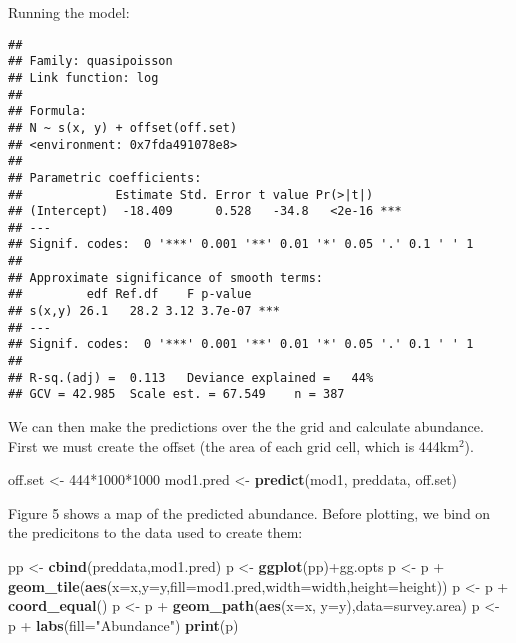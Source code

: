 \documentclass[]{article}
\newenvironment{Shaded}{}{}
\newcommand{\KeywordTok}[1]{\textcolor[rgb]{0.00,0.44,0.13}{\textbf{{#1}}}}
\newcommand{\DataTypeTok}[1]{\textcolor[rgb]{0.56,0.13,0.00}{{#1}}}
\newcommand{\DecValTok}[1]{\textcolor[rgb]{0.25,0.63,0.44}{{#1}}}
\newcommand{\StringTok}[1]{\textcolor[rgb]{0.25,0.44,0.63}{{#1}}}
\newcommand{\NormalTok}[1]{{#1}}
\begin{document}
Running the model:

\begin{Shaded}
\end{Shaded}

\begin{verbatim}
## 
## Family: quasipoisson 
## Link function: log 
## 
## Formula:
## N ~ s(x, y) + offset(off.set)
## <environment: 0x7fda491078e8>
## 
## Parametric coefficients:
##             Estimate Std. Error t value Pr(>|t|)    
## (Intercept)  -18.409      0.528   -34.8   <2e-16 ***
## ---
## Signif. codes:  0 '***' 0.001 '**' 0.01 '*' 0.05 '.' 0.1 ' ' 1
## 
## Approximate significance of smooth terms:
##         edf Ref.df    F p-value    
## s(x,y) 26.1   28.2 3.12 3.7e-07 ***
## ---
## Signif. codes:  0 '***' 0.001 '**' 0.01 '*' 0.05 '.' 0.1 ' ' 1
## 
## R-sq.(adj) =  0.113   Deviance explained =   44%
## GCV = 42.985  Scale est. = 67.549    n = 387
\end{verbatim}

We can then make the predictions over the the grid and calculate
abundance. First we must create the offset (the area of each grid cell,
which is 444km\(^2\)).

\begin{Shaded}
\begin{Highlighting}[]
\NormalTok{off.set <-}\StringTok{ }\DecValTok{444}\NormalTok{*}\DecValTok{1000}\NormalTok{*}\DecValTok{1000}
\NormalTok{mod1.pred <-}\StringTok{ }\KeywordTok{predict}\NormalTok{(mod1, preddata, off.set)}
\end{Highlighting}
\end{Shaded}

Figure 5 shows a map of the predicted abundance. Before plotting, we
bind on the predicitons to the data used to create them:

\begin{Shaded}
\begin{Highlighting}[]
\NormalTok{pp <-}\StringTok{ }\KeywordTok{cbind}\NormalTok{(preddata,mod1.pred)}
\NormalTok{p <-}\StringTok{ }\KeywordTok{ggplot}\NormalTok{(pp)+gg.opts}
\NormalTok{p <-}\StringTok{ }\NormalTok{p +}\StringTok{ }\KeywordTok{geom_tile}\NormalTok{(}\KeywordTok{aes}\NormalTok{(}\DataTypeTok{x=}\NormalTok{x,}\DataTypeTok{y=}\NormalTok{y,}\DataTypeTok{fill=}\NormalTok{mod1.pred,}\DataTypeTok{width=}\NormalTok{width,}\DataTypeTok{height=}\NormalTok{height))}
\NormalTok{p <-}\StringTok{ }\NormalTok{p +}\StringTok{ }\KeywordTok{coord_equal}\NormalTok{()}
\NormalTok{p <-}\StringTok{ }\NormalTok{p +}\StringTok{ }\KeywordTok{geom_path}\NormalTok{(}\KeywordTok{aes}\NormalTok{(}\DataTypeTok{x=}\NormalTok{x, }\DataTypeTok{y=}\NormalTok{y),}\DataTypeTok{data=}\NormalTok{survey.area)}
\NormalTok{p <-}\StringTok{ }\NormalTok{p +}\StringTok{ }\KeywordTok{labs}\NormalTok{(}\DataTypeTok{fill=}\StringTok{"Abundance"}\NormalTok{)}
\KeywordTok{print}\NormalTok{(p)}
\end{Highlighting}
\end{Shaded}
\end{document}
